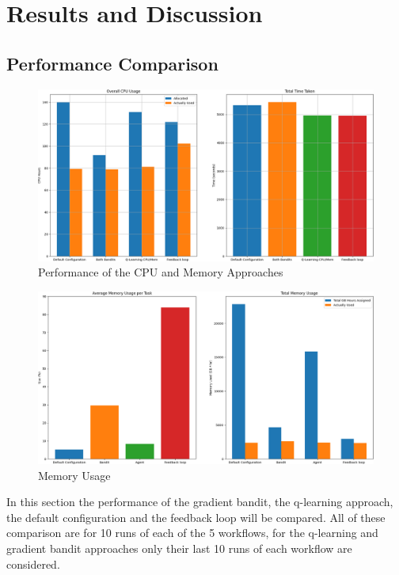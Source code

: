 \section{Results and Discussion}
\label{sec:analysis}

\subsection{Performance Comparison}
\label{sub:comp_perf}

\begin{figure}[h]
    \centering
        \includegraphics[width=\textwidth]{fig/cpu_mem_results.png}
        \caption{Performance of the CPU and Memory Approaches}
        \label{fig:cpu_results}
\end{figure}

\begin{figure}[h]
    \centering
        \includegraphics[width=\textwidth]{fig/cropped_memory_usage_final.png}
        \caption{Memory Usage}
        \label{fig:mem_use}
\end{figure}

In this section the performance of the gradient bandit, the q-learning approach, the default configuration and the feedback loop will be compared. All of these comparison are for 10 runs of each of the 5 workflows, for the q-learning and gradient bandit approaches only their last 10 runs of each workflow are considered.

